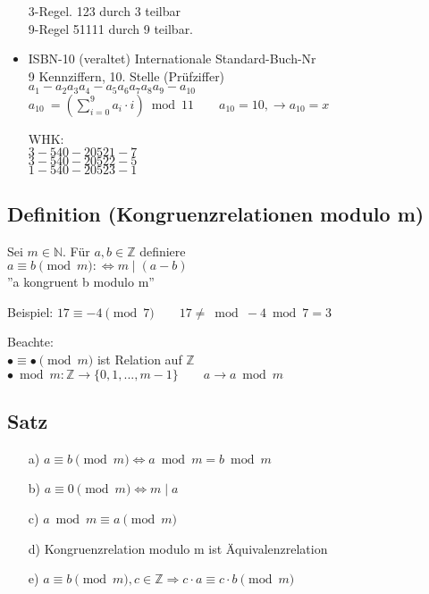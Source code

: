 \documentclass[a4paper, 12pt, twoside] {article}
\begin{document}
\begin{itemize}
3-Regel. 123 durch 3 teilbar \\
9-Regel 51111 durch 9 teilbar.

\item ISBN-10 (veraltet) %
Internationale Standard-Buch-Nr \\
9 Kennziffern, 10. Stelle (Prüfziffer) \\
$a_1 - a_2 a_3 a_4 - a_5 a_6 a_7 a_8 a_9 - a_{10}$ \\

$a_{10}\ = (\displaystyle\sum^{9}_{i=0} a_i  \cdot  i) \bmod 11 \qquad a_{10} = 10, \rightarrow a_{10} = x$

WHK: \\
$3-540-20521-7$ \\
$3-540-20522-5$ \\
$1-540-20523-1$

\end{itemize}

\subsection{Definition (Kongruenzrelationen modulo m)} %
Sei $m \in \mathbb{N}$. Für $a, b \in \mathbb{Z}$ definiere \\
$a \equiv b \pmod m : \Leftrightarrow m \mid (a-b)$ \\

''a kongruent b modulo m''

Beispiel: $17 \equiv -4 \pmod 7 \qquad 17 \neq \bmod -4 \bmod 7 = 3$

Beachte: \\
$\bullet \equiv \bullet \pmod m$ ist Relation auf $\mathbb{Z}$ \\
$\bullet \bmod m : \mathbb{Z} \rightarrow \{0, 1, ..., m-1\} \qquad a \rightarrow a \bmod m$

\subsection[Satz (zu Kongruenzrelationen)]{Satz} %
\begin{itemize}

\item[a)] $a \equiv b \pmod m \Leftrightarrow a \bmod m = b \bmod m$
\item[b)] $a \equiv 0 \pmod m \Leftrightarrow m \mid a$
\item[c)] $a \bmod m \equiv a \pmod m$
\item[d)] Kongruenzrelation modulo m ist Äquivalenzrelation
\item[e)] $a \equiv b \pmod m , c \in \mathbb{Z} \Rightarrow c \cdot a \equiv c \cdot b \pmod m$

\end{itemize}
\end{document}
